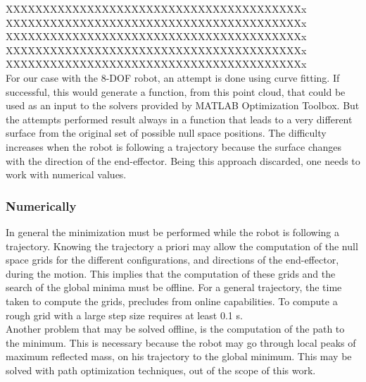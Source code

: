 XXXXXXXXXXXXXXXXXXXXXXXXXXXXXXXXXXXXXXXXx \\
XXXXXXXXXXXXXXXXXXXXXXXXXXXXXXXXXXXXXXXXx \\
XXXXXXXXXXXXXXXXXXXXXXXXXXXXXXXXXXXXXXXXx \\
XXXXXXXXXXXXXXXXXXXXXXXXXXXXXXXXXXXXXXXXx \\
XXXXXXXXXXXXXXXXXXXXXXXXXXXXXXXXXXXXXXXXx \\





For our case with the 8-DOF robot, an attempt is done using curve fitting. If successful, this would generate a function, from this point cloud, that could be used as an input to the solvers provided by MATLAB Optimization Toolbox. But the attempts performed result always in a function that leads to a very different surface from the original  set of possible null space positions. The difficulty increases when the robot is following a trajectory because the surface changes with the direction of the end-effector. Being this approach discarded, one needs to work with numerical values. 





\subsubsection{Numerically}
\label{sec:global_numerical}


In general the minimization must be performed while the robot is following a trajectory. Knowing the trajectory a priori may allow the computation of the null space grids for the different configurations, and directions of the end-effector, during the motion. This implies that the computation of these grids and the search of the global minima must be offline. For a general trajectory, the time taken to compute the grids, precludes from online capabilities. To compute a rough grid with a large step size requires at least 0.1 s.\\
%
Another problem that may be solved offline, is the computation of the path to the minimum. This is necessary because the robot may go through local peaks of maximum reflected mass, on his trajectory to the global minimum. This may be solved with path optimization techniques, out of the scope of this work. 


